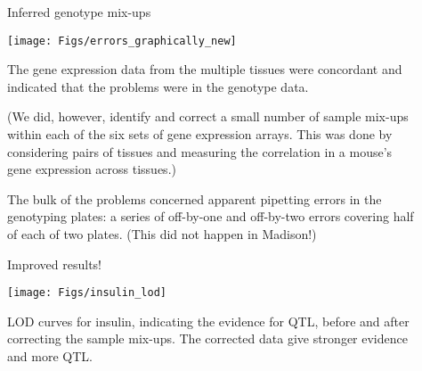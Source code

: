 \documentclass[final,plain]{beamer}
\newlength{\sepwid}
\newlength{\onecolwid}
\begin{document}
\begin{frame}[t]
\begin{columns}[t]
\begin{column}{\onecolwid}
  \end{column}

\begin{column}{\sepwid} \end{column}                 %
  
    

  \begin{column}{\onecolwid}
    
    \begin{block}{Inferred genotype mix-ups}
    \centerline{\texttt{[image: Figs/errors\_graphically\_new]}}

\vspace{5mm}

The gene expression data from the multiple tissues were concordant and
indicated that the problems were in the genotype data.

\vspace{18pt}

(We did, however, identify and correct a small number of sample
mix-ups within each of the six sets of gene expression arrays.  This
was done by considering pairs of tissues and measuring the correlation
in a mouse's gene expression across tissues.)

\vspace{18pt}

The bulk of the problems concerned apparent pipetting errors in the
genotyping plates: a series of off-by-one and off-by-two errors
covering half of each of two plates.  (This {\color{nred} did not}
happen in Madison!)

\end{block}


\vspace{18mm} %


    \begin{block}{Improved results!}
    \centerline{\texttt{[image: Figs/insulin\_lod]}}

\vspace{-5mm}

LOD curves for insulin, indicating the evidence for QTL, before and
after correcting the sample mix-ups.  The corrected data give stronger
evidence and more QTL.
\end{block}


\vspace{18mm} %




\end{column}
\end{columns}
\end{frame}
\end{document}

